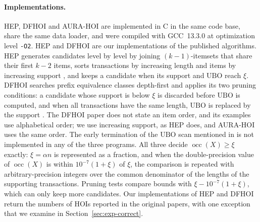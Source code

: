 \documentclass[pdflatex,sn-mathphys,Numbered]{sn-jnl}
\theoremstyle{thmstyleone}
\theoremstyle{thmstyletwo}
\theoremstyle{thmstylethree}
\newcommand{\socc}{\operatorname{occ}}
\newcommand{\Ubo}{\mathrm{UBO}}
\newcommand{\AURA}{AURA-HOI}
\begin{document}
\paragraph{Implementations.}
HEP, DFHOI and \AURA{} are implemented in C in the same code base, share the same data loader, and were compiled with GCC~13.3.0 at optimization level \texttt{-O2}. HEP and DFHOI are our implementations of the published algorithms. HEP \cite{deng2020hoi} generates candidates level by level by joining $(k-1)$-itemsets that share their first $k-2$ items, sorts transactions by increasing length and items by increasing support \cite[Section~3.2.3]{deng2020hoi}, and keeps a candidate when its support and $\Ubo$ reach $\xi$. DFHOI \cite{nguyen2023dfhoi} searches prefix equivalence classes depth-first and applies its two pruning conditions: a candidate whose support is below $\xi$ is discarded before $\Ubo$ is computed, and when all transactions have the same length, $\Ubo$ is replaced by the support \cite[Theorem~3]{nguyen2023dfhoi}. The DFHOI paper does not state an item order, and its examples use alphabetical order; we use increasing support, as HEP does, and \AURA{} uses the same order. The early termination of the $\Ubo$ scan mentioned in \cite[Section~3.2.3]{deng2020hoi} is not implemented in any of the three programs. All three decide $\socc(X) \ge \xi$ exactly: $\xi = \alpha n$ is represented as a fraction, and when the double-precision value of $\socc(X)$ is within $10^{-7}(1 + \xi)$ of $\xi$, the comparison is repeated with arbitrary-precision integers over the common denominator of the lengths of the supporting transactions. Pruning tests compare bounds with $\xi - 10^{-7}(1 + \xi)$, which can only keep more candidates. Our implementations of HEP and DFHOI return the numbers of HOIs reported in the original papers, with one exception that we examine in Section~\ref{sec:exp-correct}.
\end{document}
